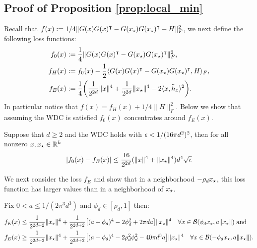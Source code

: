 \subsection{Proof of Proposition \ref{prop:local_min}}\label{sec:proof_loc_min}

Recall that $f(x):= 1/4 \|G(x)G(x)^\intercal - G({x_{\star}})G({x_{\star}})^\intercal - H\|^2_F$, we next define the following loss functions:
\[
\begin{aligned}
f_0(x) &:= \frac{1}{4} \|G(x)G(x)^\intercal - G({x_{\star}})G({x_{\star}})^\intercal\|^2_F, \\
f_H(x) &:= f_0(x) - \frac{1}{2} \langle G(x)G(x)^\intercal- G({x_{\star}})G({x_{\star}})^\intercal, H  \rangle_F, \\
f_E(x) &:= \frac{1}{4} \bigg( \frac{1}{2^{2d}}\|x\|^4 + \frac{1}{2^{2d}} \|{x_{\star}}\|^4 -2 \langle x, \tilde{h}_x \rangle^2 \bigg).
\end{aligned}
\]
In particular notice that $f(x) = f_H(x) + 1/4 \|H\|^2_F$. Below we show that assuming the WDC is satisfied 
$f_0(x)$ concentrates around $f_E(x)$. 

\begin{lemma}\label{lemma:f0_conctr}
	Suppose that $d\geq 2$ and the WDC holds with $\epsilon < 1/(16 \pi d^2)^2$, then for all nonzero $x, {x_{\star}} \in \mathbb{R}^k$
	\[
	|f_0(x) - f_E(x)| \leq	\frac{16}{2^{2d}}  (\|x\|^4  + \|{x_{\star}}\|^4) d^4 \sqrt{\epsilon}
	\]
\end{lemma}

We next consider the loss $f_E$ and show that 
in a neighborhood $-\rho_d {x_{\star}}$, this loss function has larger values than 
in a neighborhood of $ {x_{\star}}$.

\begin{lemma}\label{lemma:UPandLOW}
	Fix $0 < a \leq 1/ (2\pi^3 d^3)$ and $\phi_d \in [\rho_d , 1]$ then:
	\[
	\begin{aligned}
	f_E(x) &\leq \frac{1}{2^{2d+2}} \|{x_{\star}}\|^4 + \frac{1}{2^{2d+2}}  \big[ (a + \phi_d)^4 - 2 \phi_d^2 + 2 \pi d a \big] \|{x_{\star}}\|^4 \quad \forall x \in \mathcal{B}(\phi_d {x_{\star}}, a \|{x_{\star}}\|) \; \text{and}\\
	f_E(x) &\geq \frac{1}{2^{2d+2}} \|{x_{\star}}\|^4 + \frac{1}{2^{2d+2}}  \big[ (a - \phi_d)^4 - 2 \rho_d^2 \phi_d^2 - 40 \pi d^3 a \big] \|{x_{\star}}\|^4 \quad \forall x \in \mathcal{B}(- \phi_d {x_{\star}}, a \|{x_{\star}}\|).\\
	\end{aligned}
	\]
\end{lemma}


